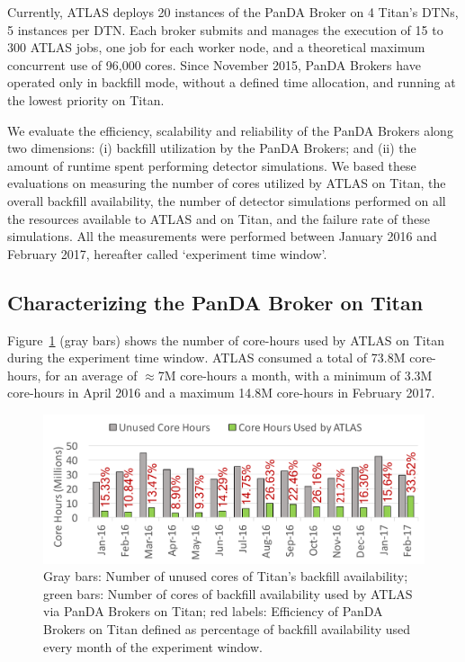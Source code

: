 Currently, ATLAS deploys 20 instances of the PanDA Broker on 4 Titan's DTNs, 5
instances per DTN. Each broker submits and manages the execution of 15 to 300
ATLAS jobs, one job for each worker node, and a theoretical maximum concurrent
use of 96,000 cores. Since November 2015, PanDA Brokers have operated only in
backfill mode, without a defined time allocation, and running at the lowest
priority on Titan.

We evaluate the efficiency, scalability and reliability of the PanDA Brokers
along two dimensions: (i) backfill utilization by the
PanDA Brokers; and (ii) the amount of runtime spent performing detector
simulations. We based these evaluations on measuring the number of cores
utilized by ATLAS on Titan, the overall backfill availability, the number of
detector simulations performed on all the resources available to ATLAS and on
Titan, and the failure rate of these simulations. All the measurements were
performed between January 2016 and February 2017, hereafter called `experiment
time window'.


\subsection{Characterizing the PanDA Broker on Titan}
\label{ssec:panda_titan}

Figure~\ref{fig:backfill-utilization} (gray bars) shows the number of core-hours
used by ATLAS on Titan during the experiment time window. ATLAS consumed a total
of 73.8M core-hours, for an average of $\approx$7M core-hours a month, with a
minimum of 3.3M core-hours in April 2016 and a maximum 14.8M core-hours in
February 2017.

\begin{figure}[htp]
    \includegraphics[clip,width=\columnwidth]{figures/backfill_consumption.pdf}
    \caption{Gray bars: Number of unused cores of Titan's backfill availability;
    green bars: Number of cores of backfill availability used by ATLAS via PanDA
    Brokers on Titan; red labels: Efficiency of PanDA Brokers on Titan defined
    as percentage of backfill availability used every month of the experiment
    window.}
\label{fig:backfill-utilization}
\end{figure}

